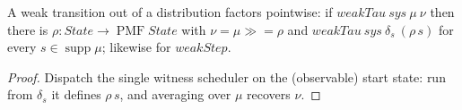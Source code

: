\begin{lemma}
  \label{lem:decomp}
  \leanok
  A weak transition out of a distribution factors pointwise: if $weakTau\ sys\ \mu\ \nu$ then there is $\rho : State \to \operatorname{PMF} State$ with $\nu = \mu \mathbin{\gg\!=} \rho$ and $weakTau\ sys\ \delta_s\ (\rho\,s)$ for every $s \in \operatorname{supp}\mu$; likewise for $weakStep$.
\end{lemma}

\begin{proof}\leanok
  Dispatch the single witness scheduler on the (observable) start state: run from $\delta_s$ it defines $\rho\,s$, and averaging over $\mu$ recovers $\nu$.
\end{proof}
